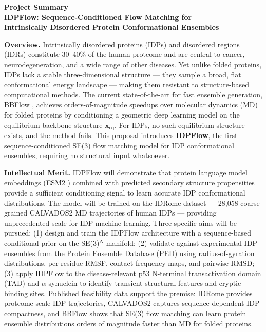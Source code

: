 \documentclass[12pt]{article}
\begin{document}
\begin{center}
  {\large\bfseries Project Summary}\\[4pt]
  \textbf{IDPFlow: Sequence-Conditioned Flow Matching for\\
  Intrinsically Disordered Protein Conformational Ensembles}
\end{center}

\noindent\textbf{Overview.}
Intrinsically disordered proteins (IDPs) and disordered regions (IDRs) constitute 30--40\% of the
human proteome and are central to cancer, neurodegeneration, and a wide range of other diseases.
Yet unlike folded proteins, IDPs lack a stable three-dimensional structure --- they sample a broad,
flat conformational energy landscape --- making them resistant to structure-based computational
methods. The current state-of-the-art for fast ensemble generation, BBFlow \cite{wolf2025bbflow},
achieves orders-of-magnitude speedups over molecular dynamics (MD) for folded proteins by
conditioning a geometric deep learning model on the equilibrium backbone structure
$\mathbf{x}_\mathrm{eq}$. For IDPs, no such equilibrium structure exists, and the method fails.
This proposal introduces \textbf{IDPFlow}, the first sequence-conditioned SE(3) flow matching
model for IDP conformational ensembles, requiring no structural input whatsoever.

\noindent\textbf{Intellectual Merit.}
IDPFlow will demonstrate that protein language model embeddings (ESM2 \cite{lin2023esm2})
combined with predicted secondary structure propensities
provide a sufficient conditioning signal to learn accurate IDP conformational distributions.
The model will be trained on the IDRome dataset \cite{tesei2024idrome} --- 28,058
coarse-grained CALVADOS2 \cite{lohr2022calvados2} MD trajectories of human IDPs --- providing
unprecedented scale for IDP machine learning.
Three specific aims will be pursued: (1) design and train the IDPFlow architecture with a
sequence-based conditional prior on the SE(3)$^N$ manifold; (2) validate against experimental
IDP ensembles from the Protein Ensemble Database (PED) \cite{lazar2021ped} using
radius-of-gyration distributions, per-residue RMSF, contact frequency maps, and pairwise RMSD;
(3) apply IDPFlow to the disease-relevant p53 N-terminal transactivation domain (TAD) and
$\alpha$-synuclein to identify transient structural features and cryptic binding sites.
Published feasibility data support the premise: IDRome provides proteome-scale IDP
trajectories, CALVADOS2 captures sequence-dependent IDP compactness, and BBFlow shows that
SE(3) flow matching can learn protein ensemble distributions orders of magnitude faster than
MD for folded proteins.
\end{document}
